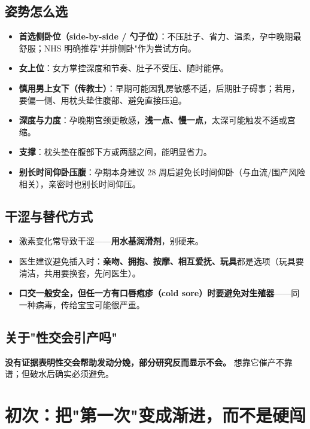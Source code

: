 \documentclass[12pt,UTF8,openany]{ctexbook}
\begin{document}
\subsection{姿势怎么选}

\begin{itemize}[leftmargin=2em,itemsep=0.3em]
  \item \textbf{首选侧卧位（side-by-side / 勺子位）}：不压肚子、省力、温柔，孕中晚期最舒服；NHS 明确推荐"并排侧卧"作为尝试方向。
  \item \textbf{女上位}：女方掌控深度和节奏、肚子不受压、随时能停。
  \item \textbf{慎用男上女下（传教士）}：早期可能因乳房敏感不适，后期肚子碍事；若用，要偏一侧、用枕头垫住腹部、避免直接压迫。
  \item \textbf{深度与力度}：孕晚期宫颈更敏感，\textbf{浅一点、慢一点}，太深可能触发不适或宫缩。
  \item \textbf{支撑}：枕头垫在腹部下方或两腿之间，能明显省力。
  \item \textbf{别长时间仰卧压腹}：孕期本身建议 28 周后避免长时间仰卧（与血流/围产风险相关），亲密时也别长时间仰压。
\end{itemize}

\subsection{干涩与替代方式}

\begin{itemize}[leftmargin=2em,itemsep=0.3em]
  \item 激素变化常导致干涩——\textbf{用水基润滑剂}，别硬来。
  \item 医生建议避免插入时：\textbf{亲吻、拥抱、按摩、相互爱抚、玩具}都是选项（玩具要清洁，共用要换套，先问医生）。
  \item \textbf{口交一般安全，但任一方有口唇疱疹（cold sore）时要避免对生殖器}——同一种病毒，传给宝宝可能很严重。
\end{itemize}

\subsection{关于"性交会引产吗"}

\textbf{没有证据表明性交会帮助发动分娩，部分研究反而显示不会。} 想靠它催产不靠谱；但破水后确实必须避免。

\section{初次：把"第一次"变成渐进，而不是硬闯}
\end{document}

